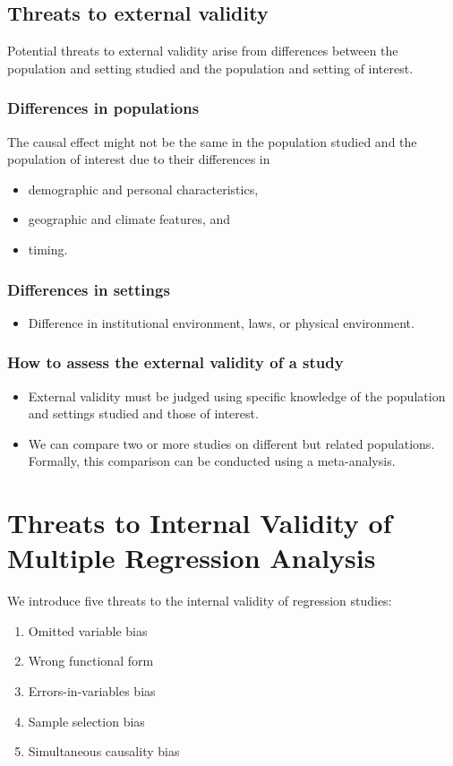 \documentclass[a4paper,11pt]{article}
\begin{document}
\subsection{Threats to external validity}
\label{sec:org1b4f979}
Potential threats to external validity arise from differences between
the population and setting studied and the population and setting of
interest. 

\subsubsection*{Differences in populations}
\label{sec:org7047dae}

The causal effect might not be the same in the population studied and
the population of interest due to their differences in
\begin{itemize}
\item demographic and personal characteristics,
\item geographic and climate features, and
\item timing.
\end{itemize}

\subsubsection*{Differences in settings}
\label{sec:orga9df22b}
\begin{itemize}
\item Difference in institutional environment, laws, or physical
environment.
\end{itemize}

\subsubsection*{How to assess the external validity of a study}
\label{sec:orged7c541}
\begin{itemize}
\item External validity must be judged using specific knowledge of the
population and settings studied and those of interest.
\item We can compare two or more studies on different but related
populations. Formally, this comparison can be conducted using a
meta-analysis.
\end{itemize}

\section{Threats to Internal Validity of Multiple Regression Analysis}
\label{sec:org4d425d9}
We introduce five threats to the internal validity of regression studies:
\begin{enumerate}
\item Omitted variable bias
\item Wrong functional form
\item Errors-in-variables bias
\item Sample selection bias
\item Simultaneous causality bias
\end{enumerate}
\end{document}
